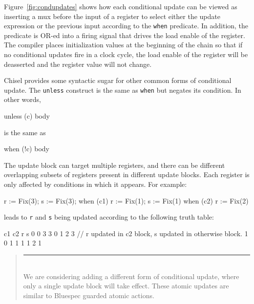 \documentclass[10pt]{article}
\newenvironment{commentary}
{ \vspace{-0.1in}
  \begin{quotation}
  \noindent
  \small \em
  \rule{\linewidth}{1pt}\\
}
{
  \end{quotation}
}
\def\code#1{{\tt #1}}
\begin{document}
Figure~\ref{fig:condupdates} shows how each conditional update can be
viewed as inserting a mux before the input of a register to select
either the update expression or the previous input according to the
\code{when} predicate.  In addition, the predicate is OR-ed into a
firing signal that drives the load enable of the register.  The
compiler places initialization values at the beginning of the chain so
that if no conditional updates fire in a clock cycle, the load enable
of the register will be deasserted and the register value will not
change.
 
Chisel provides some syntactic sugar for other common forms of
conditional update.  The \verb+unless+ construct is the same as
\verb+when+ but negates its condition.  In other words,
\begin{scala}
unless (c) { body }
\end{scala}
is the same as
\begin{scala}
when (!c) { body }
\end{scala}

% 

The update block can target multiple registers, and there can be
different overlapping subsets of registers present in different update
blocks.  Each register is only affected by conditions in which it
appears.  For example:
\begin{scala}
r := Fix(3); s := Fix(3);
when (c1)   { r := Fix(1); s := Fix(1) }
when (c2)   { r := Fix(2) }
\end{scala}

\noindent
leads to \code{r} and \code{s} being updated according to the
following truth table:
\begin{scala}
c1 c2  r  s
0   0  3  3
0   1  2  3 // r updated in c2 block, s updated in otherwise block.
1   0  1  1
1   1  2  1
\end{scala}

\begin{commentary}
We are considering adding a different form of conditional update,
where only a single update block will take effect.  These atomic
updates are similar to Bluespec guarded atomic actions.
\end{commentary}
\end{document}

